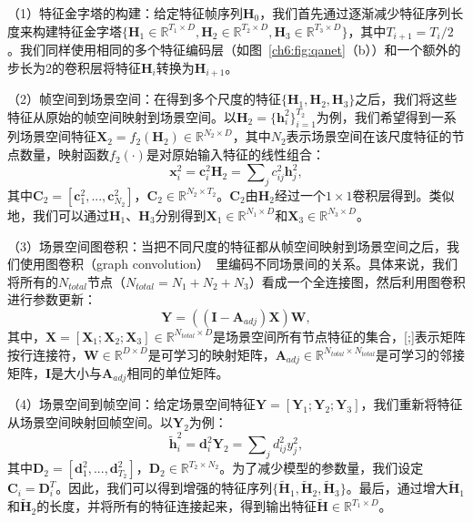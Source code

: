 （1）特征金字塔的构建：给定特征帧序列$\bm{H}_0$，我们首先通过逐渐减少特征序列长度来构建特征金字塔$\{\bm{H}_1 \in \mathbb{R}^{T_1\times D}, \bm{H}_2 \in \mathbb{R}^{T_2\times D}, \bm{H}_3 \in \mathbb{R}^{T_3\times D}\}$，其中$T_{i+1} = T_i/2$。我们同样使用相同的多个特征编码层（如图~\ref{ch6:fig:qanet}（b））和一个额外的步长为2的卷积层将特征$\bm{H}_i$转换为$\bm{H}_{i+1}$。

（2）帧空间到场景空间：在得到多个尺度的特征$\{\bm{H}_1, \bm{H}_2, \bm{H}_3\}$之后，我们将这些特征从原始的帧空间映射到场景空间。以$\bm{H}_2 = \{\bm{h}^2_i\}^{T_2}_{i=1}$为例，我们希望得到一系列场景空间特征$\bm{X}_2 = f_2(\bm{H}_2) \in \mathbb{R}^{N_2\times D}$，其中$N_2$表示场景空间在该尺度特征的节点数量，映射函数$f_2(\cdot)$是对原始输入特征的线性组合：
\begin{equation} \label{ch6:eq:eq_2}
    \bm{x}^2_i = \bm{c}^2_i \bm{H}_2 = \sum\nolimits_j c^2_{ij}\bm{h}^2_j,
\end{equation}
其中$\bm{C}_2 = [\bm{c}^2_1, ..., \bm{c}^2_{N_2}]$，$\bm{C}_2 \in \mathbb{R}^{N_2\times T_2}$。$\bm{C}_2$由$\bm{H}_2$经过一个$1\times1$卷积层得到。类似地，我们可以通过$\bm{H}_1$、$\bm{H}_3$分别得到$\bm{X}_1 \in \mathbb{R}^{N_1\times D}$和$\bm{X}_3 \in \mathbb{R}^{N_3\times D}$。

（3）场景空间图卷积：当把不同尺度的特征都从帧空间映射到场景空间之后，我们使用图卷积（graph convolution）~\cite{kipf2017semi}里编码不同场景间的关系。具体来说，我们将所有的$N_{total}$节点（$N_{total} = N_1 + N_2 + N_3$）看成一个全连接图，然后利用图卷积进行参数更新：
\begin{equation}
    \bm{Y} = ((\bm{I}-\bm{A}_{adj})\bm{X})\bm{W},
\end{equation}
其中，$\bm{X} = [\bm{X}_1; \bm{X}_2; \bm{X}_3] \in \mathbb{R}^{N_{total}\times D}$是场景空间所有节点特征的集合，[;]表示矩阵按行连接符，$\bm{W}\in \mathbb{R}^{D\times D}$是可学习的映射矩阵，$\bm{A}_{adj} \in \mathbb{R}^{N_{total}\times N_{total}}$是可学习的邻接矩阵，$\bm{I}$是大小与$\bm{A}_{adj}$相同的单位矩阵。

（4）场景空间到帧空间：给定场景空间特征$\bm{Y} = [\bm{Y}_1; \bm{Y}_2; \bm{Y}_3]$，我们重新将特征从场景空间映射回帧空间。以$\bm{Y}_2$为例：
\begin{equation}
    \tilde{\bm{h}}^2_i = \bm{d}^2_i \bm{Y}_2 = \sum\nolimits_j d^2_{ij} y^2_j,
\end{equation}
其中$\bm{D}_2 = [\bm{d}^2_1, ..., \bm{d}^2_{T_2}]$，$\bm{D}_2 \in \mathbb{R}^{T_2 \times N_2}$。为了减少模型的参数量，我们设定$\bm{C}_i=\bm{D}^T_i$。因此，我们可以得到增强的特征序列$\{\tilde{\bm{H}}_1, \tilde{\bm{H}}_2, \tilde{\bm{H}}_3\}$。最后，通过增大$\tilde{\bm{H}}_1$和$\tilde{\bm{H}}_2$的长度，并将所有的特征连接起来，得到输出特征$\tilde{\bm{H}} \in \mathbb{R}^{T_1 \times D}$。


